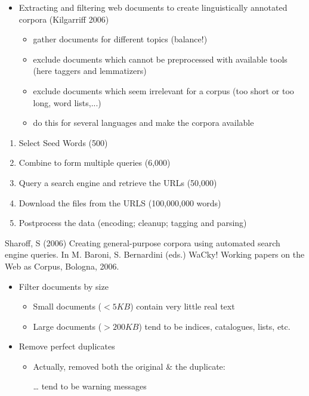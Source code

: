 \documentclass[a4paper,landscape,headrule,footrule,dvips]{foils}
\begin{document}
\begin{CJK}{UTF8}{min}
\MyLogo{}
\begin{itemize}
\item Extracting and filtering web documents to create linguistically
  annotated corpora (Kilgarriff 2006)
  \begin{itemize}
  \item gather documents for different topics (balance!)
  \item exclude documents which cannot be preprocessed with available
    tools (here taggers and lemmatizers)
  \item exclude documents which seem irrelevant for a corpus (too short or
    too long, word lists,...)
  \item do this for several languages and make the corpora available
  \end{itemize}
\end{itemize}



\begin{enumerate}
\item Select Seed Words (500)
\item Combine to form multiple queries (6,000)
\item Query a search engine and retrieve the URLs (50,000)
\item Download the files from the URLS (100,000,000 words)
\item Postprocess the data (encoding; cleanup; tagging and parsing)
\end{enumerate}

Sharoff, S (2006) Creating general-purpose corpora using automated search engine queries. In M. Baroni, S. Bernardini (eds.) WaCky! Working papers on the Web as Corpus, Bologna, 2006.



\begin{itemize}
\item Filter documents by size
  \begin{itemize}
  \item Small documents ($<5KB$) contain very little real text
  \item Large documents ($>200KB$) tend to be indices, catalogues, lists, etc.
  \end{itemize}
\item Remove perfect duplicates
  \begin{itemize}
  \item Actually, removed both the original \& the duplicate:
  \item[\ldots] tend to be warning messages 
  \end{itemize}
\end{itemize}


\end{CJK}
\end{document}
